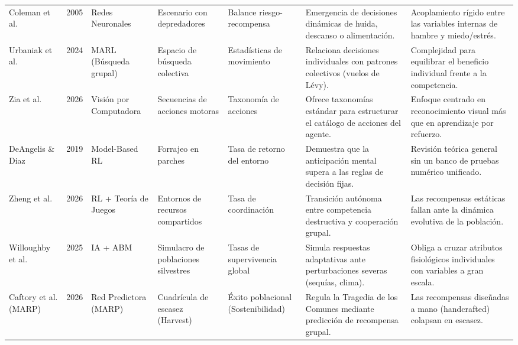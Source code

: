 \documentclass[conference]{IEEEtran}
\begin{document}
\begin{table}[tbp]
\begin{tabular}{p{1.6cm} c p{2.0cm} p{2.0cm} p{2.2cm} p{3.5cm} p{3.4cm}}
Coleman et al. \cite{Paper6} &
2005 &
Redes Neuronales &
Escenario con depredadores &
Balance riesgo-recompensa &
Emergencia de decisiones dinámicas de huida, descanso o alimentación. &
Acoplamiento rígido entre las variables internas de hambre y miedo/estrés. \\

\addlinespace

Urbaniak et al. \cite{Paper7} &
2024 &
MARL (Búsqueda grupal) &
Espacio de búsqueda colectiva &
Estadísticas de movimiento &
Relaciona decisiones individuales con patrones colectivos (vuelos de Lévy). &
Complejidad para equilibrar el beneficio individual frente a la competencia. \\

\addlinespace

Zia et al. \cite{Paper8} &
2026 &
Visión por Computadora &
Secuencias de acciones motoras &
Taxonomía de acciones &
Ofrece taxonomías estándar para estructurar el catálogo de acciones del agente. &
Enfoque centrado en reconocimiento visual más que en aprendizaje por refuerzo. \\

\addlinespace

DeAngelis \& Diaz \cite{Survey1} &
2019 &
Model-Based RL &
Forrajeo en parches &
Tasa de retorno del entorno &
Demuestra que la anticipación mental supera a las reglas de decisión fijas. &
Revisión teórica general sin un banco de pruebas numérico unificado. \\

\addlinespace

Zheng et al. \cite{Paper9} &
2026 &
RL + Teoría de Juegos &
Entornos de recursos compartidos &
Tasa de coordinación &
Transición autónoma entre competencia destructiva y cooperación grupal. &
Las recompensas estáticas fallan ante la dinámica evolutiva de la población. \\

\addlinespace

Willoughby et al. \cite{Paper10} &
2025 &
IA + ABM &
Simulacro de poblaciones silvestres &
Tasas de supervivencia global &
Simula respuestas adaptativas ante perturbaciones severas (sequías, clima). &
Obliga a cruzar atributos fisiológicos individuales con variables a gran escala. \\

\addlinespace

Caftory et al. (MARP) \cite{Paper11} &
2026 &
Red Predictora (MARP) &
Cuadrícula de escasez (Harvest) &
Éxito poblacional (Sostenibilidad) &
Regula la Tragedia de los Comunes mediante predicción de recompensa grupal. &
Las recompensas diseñadas a mano (handcrafted) colapsan en escasez. \\


\end{tabular}
\end{table}
\end{document}
